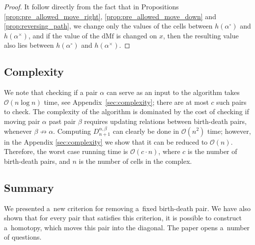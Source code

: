 \documentclass[a4paper,12pt, USenglish,cleveref,autoref,thm-restate]{article}
\newcommand\michal[1]{\textcolor{magenta}{[ML: #1]}}
\newcommand{\mf}{h}
\newcommand{\dmf}{\text{dMf}}
\newcommand{\mD}{D}
\newcommand{\cx}{x}
\newcommand{\bth}[1]{#1^\circ}
\newcommand{\dth}[1]{#1^{\!\times}}
\newcommand{\norel}{\nrightarrow}
\newcommand{\bds}{\alpha}
\newcommand{\bdt}{\beta}
\begin{document}
\begin{proof}
    It follow directly from the fact that in Propositions \ref{prop:pre_allowed_move_right}, \ref{prop:pre_allowed_move_down} and \ref{prop:reversing_path}, we change only the values of the cells between $\mf(\bth\bds)$ and $\mf(\dth\bds)$, and if the value of the $\dmf$ is changed on $\cx$, then the resulting value also lies between $\mf(\bth\bds)$ and $\mf(\dth\bds)$.
\end{proof}

\subsection{Complexity}
We note that checking if a pair $\bds$ can serve as an input to the algorithm takes $\mathcal{O}(n \log n)$ time, see Appendix~\ref{sec:complexity}; there are at most $c$ such pairs to check.
The complexity of the algorithm is dominated by the cost of checking if moving pair $\bds$ past pair $\bdt$ requires updating relations between birth-death pairs, whenever $\bdt \norel \bds$.
Computing \(\mD_{n+1}^{\bds,\bdt}\) can clearly be done in \(\mathcal{O}(n^2)\) time; however, in the Appendix \ref{sec:complexity} we show that it can be reduced to \(\mathcal{O}(n)\).
 Therefore, the worst case running time is $\mathcal{O}(c \cdot n)$, where $c$ is the number of birth-death pairs, and $n$ is the number of cells in the complex.

 \subsection{Summary}

We presented a~new criterion for removing a~fixed birth-death pair.
We have also shown that for every pair that satisfies this criterion, it is possible to construct a~homotopy, which moves this pair into the diagonal.
The paper opens a~number of questions.
\end{document}
